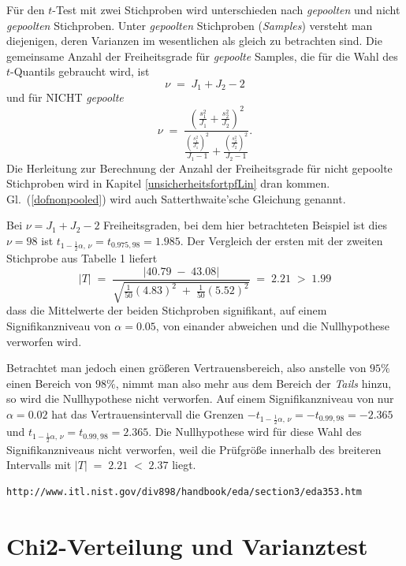 Für den $t$-Test mit zwei Stichproben wird unterschieden nach \textsl{gepoolten} und nicht \textsl{gepoolten}
Stichproben. Unter \textsl{gepoolten} Stichproben (\textsl{Samples}) versteht man diejenigen, deren Varianzen
im wesentlichen als gleich zu betrachten sind.
Die gemeinsame Anzahl der Freiheitsgrade für \textsl{gepoolte} Samples, die für die Wahl des $t$-Quantils gebraucht wird, ist
\begin{equation}
\nu \; = \; J_1 + J_2 - 2
\label{dofpooled}
\end{equation}
und für NICHT \textsl{gepoolte}
\begin{equation}
\nu \; = \;
 \frac{ \left(\frac{s_1^2}{J_1} +\frac{s_2^2}{J_2}\right)^2}{ 
  \frac{\left(\frac{s_1^2}{J_1}\right)^2}{J_1 - 1} + \frac{\left(\frac{s_2^2}{J_2}\right)^2}{J_2 - 1} } .
\label{dofnonpooled}
\end{equation}
Die Herleitung zur Berechnung der Anzahl der Freiheitsgrade für nicht gepoolte Stichproben
wird in Kapitel \ref{unsicherheitsfortpfLin} dran kommen. Gl.~(\ref{dofnonpooled}) wird auch
Satterthwaite'sche Gleichung genannt.

Bei $\nu = J_1 + J_2 - 2$ Freiheitsgraden, bei dem hier betrachteten Beispiel ist dies
$\nu = 98$ ist $t_{1-\frac{1}{2} \alpha, \, \nu} = t_{0.975, 98} = 1.985$.
Der Vergleich der ersten mit der zweiten Stichprobe aus Tabelle 1 liefert
$$
|T| \; = \; \frac{|40.79 \; - \; 43.08|}{\sqrt{\frac{1}{50} (4.83)^2 \; + \; \frac{1}{50} (5.52)^2}}
\; = \; 2.21  \; > \; 1.99
$$
dass die Mittelwerte der beiden Stichproben signifikant, auf einem Signifikanzniveau von
$\alpha = 0.05$, von einander abweichen und die Nullhypothese verworfen wird.

Betrachtet man jedoch einen größeren Vertrauensbereich, also anstelle von $95 \%$ einen
Bereich von $98 \%$, nimmt man also mehr aus dem Bereich der \textsl{Tails} hinzu, so
wird die Nullhypothese nicht verworfen. Auf einem Signifikanzniveau von nur
$\alpha = 0.02$ hat das Vertrauensintervall die Grenzen
$-t_{1-\frac{1}{2} \alpha, \, \nu} = -t_{0.99, 98} = -2.365$ und
$t_{1-\frac{1}{2} \alpha, \, \nu} = t_{0.99, 98} = 2.365$. Die
Nullhypothese wird für diese Wahl des Signifikanzniveaus nicht verworfen,
weil die Prüfgröße innerhalb des breiteren Intervalls mit
$|T| \; = \; 2.21 \; < \; 2.37$ liegt.

\begin{verbatim}
http://www.itl.nist.gov/div898/handbook/eda/section3/eda353.htm
\end{verbatim}

\section{Chi2-Verteilung und Varianztest}



